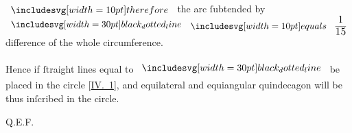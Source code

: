 \documentclass[12pt,preview]{standalone}
\begin{document}
\begin{minipage}[t]{0.64\textwidth}
    \hfill

    \hfill

    $\btherefore$ the arc ſubtended by $\dottedblackline \bequals \ \dfrac{\text{\large 1}}{\text{\large 15}}\ $ difference of the whole circumference.\\
    \hfill\\
    Hence if ſtraight lines equal to $\dottedblackline$ be placed in the circle \mbox{[\hyperref[book4pr1]{\textsc{IV.} 1}]}, and equilateral and equiangular quindecagon will be thus inſcribed in the circle.

    \hfill

    \hfill Q.E.F.
\end{minipage}%
\hfill
\begin{minipage}[t]{0.33\textwidth}
    \vspace{40pt}
    
\end{minipage}%
\end{document}
